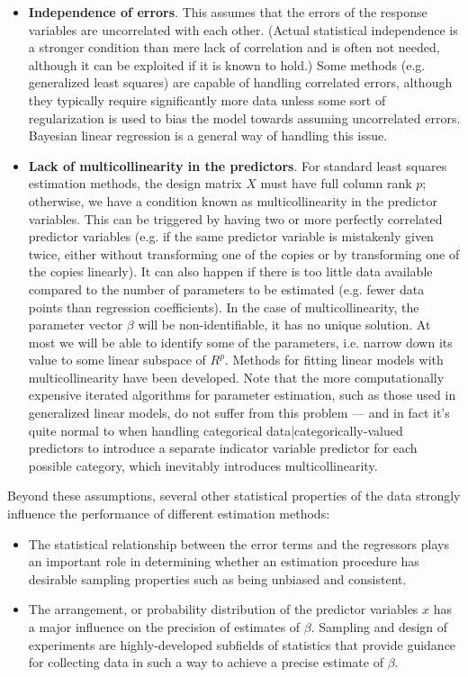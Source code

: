 \begin{itemize}
  \item \textbf{Independence of errors}.  This assumes that the errors of the response variables are uncorrelated with each other. (Actual statistical independence is a stronger condition than mere lack of correlation and is often not needed, although it can be exploited if it is known to hold.) Some methods (e.g. generalized least squares) are capable of handling correlated errors, although they typically require significantly more data unless some sort of regularization is used to bias the model towards assuming uncorrelated errors. Bayesian linear regression is a general way of handling this issue.

  \item \textbf{Lack of multicollinearity in the predictors}.  For standard least squares estimation methods, the design matrix $X$ must have full column rank $p$; otherwise, we have a condition known as multicollinearity in the predictor variables.  This can be triggered by having two or more perfectly correlated predictor variables (e.g. if the same predictor variable is mistakenly given twice, either without transforming one of the copies or by transforming one of the copies linearly). It can also happen if there is too little data available compared to the number of parameters to be estimated (e.g. fewer data points than regression coefficients). In the case of multicollinearity, the parameter vector $\beta$ will be non-identifiable, it has no unique solution.  At most we will be able to identify some of the parameters, i.e. narrow down its value to some linear subspace of $R^p$. Methods for fitting linear models with multicollinearity have been developed. Note that the more computationally expensive iterated algorithms for parameter estimation, such as those used in generalized linear models, do not suffer from this problem — and in fact it's quite normal to when handling categorical data|categorically-valued predictors to introduce a separate indicator variable predictor for each possible category, which inevitably introduces multicollinearity.
\end{itemize}

Beyond these assumptions, several other statistical properties of the data strongly influence the performance of different estimation methods:

\begin{itemize}
  \item The statistical relationship between the error terms and the regressors plays an important role in determining whether an estimation procedure has desirable sampling properties such as being unbiased and consistent.
  \item The arrangement, or probability distribution of the predictor variables $x$ has a major influence on the precision of estimates of $\beta$. Sampling and design of experiments are highly-developed subfields of statistics that provide guidance for collecting data in such a way to achieve a precise estimate of $\beta$.
\end{itemize}

